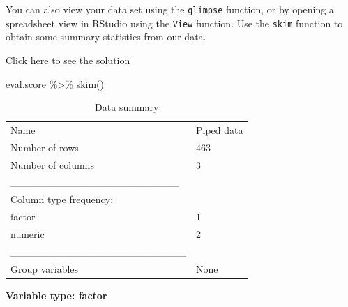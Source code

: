 \documentclass[
  letterpaper,
  DIV=11,
  numbers=noendperiod]{scrartcl}
\newenvironment{Shaded}{\begin{snugshade}}{\end{snugshade}}
\newcommand{\FunctionTok}[1]{\textcolor[rgb]{0.28,0.35,0.67}{#1}}
\newcommand{\NormalTok}[1]{\textcolor[rgb]{0.00,0.23,0.31}{#1}}
\newcommand{\SpecialCharTok}[1]{\textcolor[rgb]{0.37,0.37,0.37}{#1}}
\begin{document}
\begin{tcolorbox}[enhanced jigsaw, colback=white, toptitle=1mm, bottomrule=.15mm, colbacktitle=quarto-callout-warning-color!10!white, breakable, title={Task 1}, colframe=quarto-callout-warning-color-frame, opacitybacktitle=0.6, toprule=.15mm, arc=.35mm, coltitle=black, leftrule=.75mm, bottomtitle=1mm, titlerule=0mm, opacityback=0, rightrule=.15mm, left=2mm]

You can also view your data set using the \texttt{glimpse} function, or
by opening a spreadsheet view in RStudio using the \texttt{View}
function. Use the \texttt{skim} function to obtain some summary
statistics from our data.

Click here to see the solution

\begin{Shaded}
\begin{Highlighting}[]
\NormalTok{eval.score }\SpecialCharTok{\%\textgreater{}\%}
  \FunctionTok{skim}\NormalTok{()}
\end{Highlighting}
\end{Shaded}

\begin{longtable}[]{@{}ll@{}}
\caption{Data summary}\tabularnewline
\toprule\noalign{}
\endfirsthead
\endhead
\bottomrule\noalign{}
\endlastfoot
Name & Piped data \\
Number of rows & 463 \\
Number of columns & 3 \\
\_\_\_\_\_\_\_\_\_\_\_\_\_\_\_\_\_\_\_\_\_\_\_ & \\
Column type frequency: & \\
factor & 1 \\
numeric & 2 \\
\_\_\_\_\_\_\_\_\_\_\_\_\_\_\_\_\_\_\_\_\_\_\_\_ & \\
Group variables & None \\
\end{longtable}

\textbf{Variable type: factor}


\end{tcolorbox}
\end{document}
